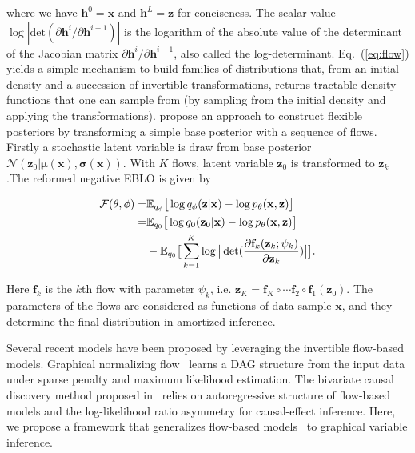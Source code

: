 \documentclass[sigconf, anonymous, review]{acmart}
\theoremstyle{plain}
\theoremstyle{definition}
\theoremstyle{remark}
\begin{document}
\vspace{-0.15in}
\noindent where we have $\mathbf{h}^0 = \mathbf{x}$ and $\mathbf{h}^L = \mathbf{z}$ for conciseness. 
The scalar value $\log |\text{det}( \partial \mathbf{h}^i/\partial \mathbf{h}^{i-1})|$ is the logarithm of the absolute value of the determinant of the Jacobian matrix $\partial \mathbf{h}^i/\partial \mathbf{h}^{i-1}$, also called the log-determinant. 
Eq.~(\ref{eq:flow}) yields a simple mechanism to build families of distributions that, from an initial density and a succession of invertible transformations, returns tractable density functions that one can sample from (by sampling from the initial density and applying the transformations). \cite{rezende2015variational} propose an approach to construct flexible posteriors by transforming  a simple base posterior with a sequence of flows. Firstly a stochastic latent variable is draw from base posterior $\mathcal{N}(\mathbf{z}_0|\mathbf{\mu}(\mathbf{x}), \mathbf{\sigma}(\mathbf{x}) )$. With $K$ flows, latent variable $\mathbf{z}_0$ is transformed to $\mathbf{z}_k$.The reformed negative EBLO is given by 

\vspace{-0.15in}
\begin{align}\label{eq:flow2}
\mathcal{F}(\theta, \phi) = & \mathbb{E}_{q_{\phi}} \big[\log q_{\phi}(\mathbf{z}|\mathbf{x}) -  \log p_{\theta}(\mathbf{x},\mathbf{z}) \big] \\ \notag
= & \mathbb{E}_{q_{0}} \big[\log q_{0}(\mathbf{z}_0|\mathbf{x}) -  \log p_{\theta}(\mathbf{x},\mathbf{z}) \big] \\ \notag
&-\mathbb{E}_{q_{0}} \big[\sum_{k=1}^K \log\big|\det(\frac{\partial \mathbf{f}_k( \mathbf{z}_k; \psi_k)}{\partial \mathbf{z}_k}) \big| \big].
\end{align}%

\vspace{-0.15in}
\noindent Here $\mathbf{f}_k$ is the $k$th flow with parameter $\psi_k$, i.e. $\mathbf{z}_K = \mathbf{f}_K \circ \cdots  \mathbf{f}_2 \circ  \mathbf{f}_1(\mathbf{z}_0)$. The parameters of the flows are considered as functions of data sample $\mathbf{x}$, and they determine the final distribution in amortized inference.


Several recent models have been proposed by leveraging the invertible  flow-based models. Graphical normalizing flow~\cite{wehenkel2021graphical}  learns a DAG structure from the input data under  sparse penalty and maximum likelihood estimation. 
The bivariate causal discovery method proposed in~\cite{khemakhem2021causal} relies on  autoregressive structure of flow-based models and the  log-likelihood ratio asymmetry for causal-effect inference. Here, we propose a framework that generalizes flow-based models~\cite{Dinh2016DensityEU, dinh2014nice,rezende2015variational,berg2018sylvester} to graphical variable inference.
\end{document}
